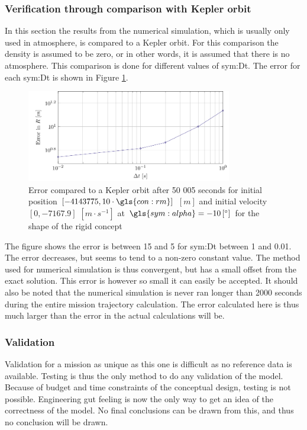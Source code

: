 \subsubsection{Verification through comparison with Kepler orbit}
\label{sec:astroverf}

In this section the results from the numerical simulation, which is usually only used in atmosphere, is compared to a Kepler orbit. For this comparison the density is assumed to be zero, or in other words, it is assumed that there is no atmosphere. This comparison is done for different values of \gls{sym:Dt}. The error for each \gls{sym:Dt} is shown in Figure \ref{fig:kep_error}.

\begin{figure}[ht]
	\centering
	\includegraphics[width=0.8\textwidth]{Figure/orbit/num_kep.pdf}
	\caption[Error compared to a Kepler orbit]{Error compared to a Kepler orbit after 50 005 seconds for initial position $\left[-4143775,10\cdot\gls{con:rm}\right]$ $\left[m\right]$ and initial velocity $\left[0,-7167.9\right]$ $\left[m\cdot s^{-1} \right]$ at $\gls{sym:alpha}=-10\left[^\circ\right]$ for the shape of the rigid concept}
	\label{fig:kep_error}
\end{figure}

The figure shows the error is between 15 and 5 for \gls{sym:Dt} between 1 and 0.01. The error decreases, but seems to tend to a non-zero constant value. The method used for numerical simulation is thus convergent, but has a small offset from the exact solution. This error is however so small it can easily be accepted. It should also be noted that the numerical simulation is never ran longer than 2000 seconds during the entire mission trajectory calculation. The error calculated here is thus much larger than the error in the actual calculations will be.

\subsubsection{Validation}
\label{sec:astroval}

Validation for a mission as unique as this one is difficult as no reference data is available. Testing is thus the only method to do any validation of the model. Because of budget and time constraints of the conceptual design, testing is not possible. Engineering gut feeling is now the only way to get an idea of the correctness of the model. No final conclusions can be drawn from this, and thus no conclusion will be drawn.